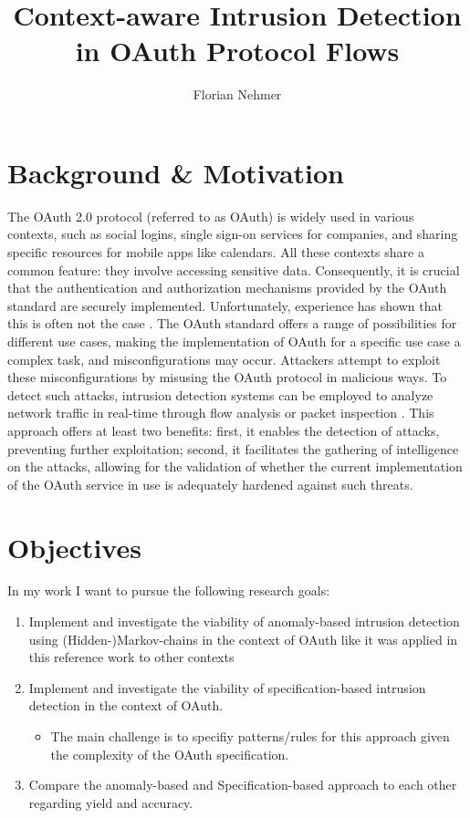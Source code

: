 \documentclass{article}
\title{Context-aware Intrusion Detection in OAuth Protocol Flows}
\author{Florian Nehmer}
\begin{document}
\maketitle

\section{Background \& Motivation}
The OAuth 2.0 protocol \cite{rfc6749} (referred to as OAuth) is widely used in various contexts, such as social logins, single sign-on services for companies, and sharing specific resources for mobile apps like calendars. All these contexts share a common feature: they involve accessing sensitive data. Consequently, it is crucial that the authentication and authorization mechanisms provided by the OAuth standard are securely implemented. Unfortunately, experience has shown that this is often not the case \cite{Li2019}. The OAuth standard offers a range of possibilities for different use cases, making the implementation of OAuth for a specific use case a complex task, and misconfigurations may occur. Attackers attempt to exploit these misconfigurations by misusing the OAuth protocol in malicious ways. To detect such attacks, intrusion detection systems can be employed to analyze network traffic in real-time through flow analysis or packet inspection \cite{Liu2019}. This approach offers at least two benefits: first, it enables the detection of attacks, preventing further exploitation; second, it facilitates the gathering of intelligence on the attacks, allowing for the validation of whether the current implementation of the OAuth service in use is adequately hardened against such threats.

\section{Objectives}
In my work I want to pursue the following research goals:

\begin{enumerate}
    \item Implement and investigate the viability of anomaly-based intrusion detection using (Hidden-)Markov-chains in the context of OAuth like it was applied in this reference work to other contexts \cite{sperotto2011}
    \item Implement and investigate the viability of specification-based intrusion detection in the context of OAuth.
    \begin{itemize}
        \item The main challenge is to specifiy patterns/rules for this approach given the complexity of the OAuth specification. 
    \end{itemize}
    \item Compare the anomaly-based and Specification-based approach to each other regarding yield and accuracy.
\end{enumerate}
\end{document}
